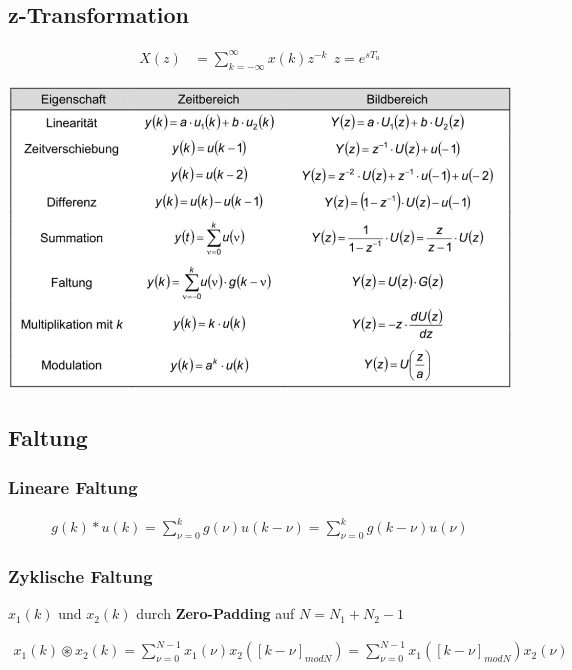 \documentclass[10pt,a4paper]{article}
\begin{document}
  \subsection{z-Transformation}
  \begin{mdframed}[style=exercise]
    \begin{align}
        X(z) &=\sum_{k=-\infty}^{\infty} x(k)z^{-k} \ \ z=e^{s T_a}
    \end{align}
  \end{mdframed}
  \begin{center}
      \includegraphics[width=.35\textwidth]{./img/z.png}
  \end{center}
  \subsection{Faltung}
  \subsubsection{Lineare Faltung}
  \begin{mdframed}[style=exercise]
    \begin{align}
        g(k)*u(k) = \sum_{\nu =0}^{k} g(\nu) u(k-\nu)= \sum_{\nu =0}^{k} g(k-\nu) u(\nu)
    \end{align}
  \end{mdframed}
  \subsubsection{Zyklische Faltung}
  $x_1(k)$ und $x_2(k)$ durch \textbf{Zero-Padding} auf $N = N_1 +N_2 -1$ 
\scriptsize
  \begin{mdframed}[style=exercise]
    \begin{align}
        x_1(k) \circledast x_2(k) = \sum_{\nu =0}^{N-1} x_1(\nu) x_2([k-\nu]_{modN})= \sum_{\nu =0}^{N-1}x_1([k-\nu]_{modN}) x_2(\nu)
    \end{align}
  \end{mdframed}
\normalsize
\end{document}
